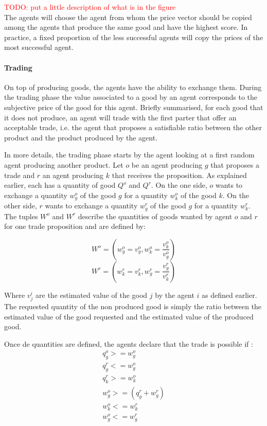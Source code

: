 \documentclass{wscpaperproc}
\newcommand{\memo}[2]{\textcolor{#1}{#2}}
\newcommand{\todo}[1]{\memo{red}{TODO: #1\\}}
\begin{document}
\todo{put a little description of what is in the figure}
The agents will choose the agent from whom the price vector should be copied among the agents that produce the same good and have the highest score. In practice, a fixed proportion of the less successful agents will copy the prices of the most successful agent. 

\paragraph{Trading} 


On top of producing goods, the agents have the ability to exchange them. During the trading phase the value associated to a good by an agent corresponds to the subjective price of the good for this agent. Briefly summarised, for each good that it does not produce, an agent will trade with the first parter that offer an acceptable trade, i.e. the agent that proposes a satisfiable ratio between the other product and the product produced by the agent. 

In more details, the trading phase starts by the agent looking at a first random agent producing another product. 
Let $o$ be an agent producing $g$ that proposes a trade and $r$ an agent producing $k$ that receives the proposition. As explained earlier, each has a quantity of good $Q^o$ and $Q^r$. On the one side, $o$ wants to exchange a quantity $w_g^o$ of the good $g$ for a quantity $w_k^o$ of the good $k$. On the other side, $r$ wants to exchange a quantity $w_g^r$ of the good $g$ for a quantity $w_k^r$. The tuples $W^o$ and $W^r$ describe the quantities of goods wanted by agent $o$ and $r$ for one trade proposition and are defined by:  

 $$ W^o=(w_g^o = v_g^o,w_k^o= \frac{v_k^o}{v_g^o}) $$ 
 $$ W^r=(w_k^r = v_k^r,w_g^r= \frac{v_g^r}{v_k^r}) $$

 Where $v_j^i$ are the estimated value of the good $j$ by the agent $i$ as defined earlier. 
The requested quantity of the non produced good is simply the ratio between the estimated value of the good requested and the estimated value of the produced good.


Once de quantities are defined, the agents declare that the trade is possible if :
\begin{align}
q_g^o >= w_g^o \\
q_g^r <= w_g^o \\
q_k^r >= w_k^o \\
w_g^o>=(q_g^r+w_g^r) \\
w_k^o<=w_k^r \\
w_g^o<=w_g^r
\end{align}
\end{document}

